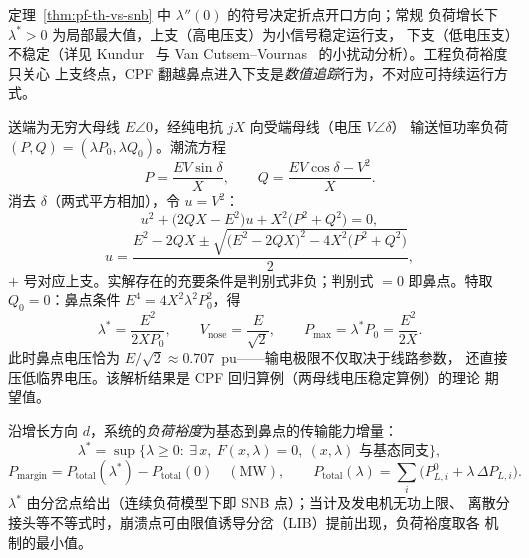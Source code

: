 \begin{remark}[鼻曲线上下支的稳定性解读]
定理~\ref{thm:pf-th-vs-snb} 中 $\lambda''(0)$ 的符号决定折点开口方向；常规
负荷增长下 $\lambda^*>0$ 为局部最大值，上支（高电压支）为小信号稳定运行支，
下支（低电压支）不稳定（详见 Kundur~\cite{pfvs:kundur} 与
Van Cutsem--Vournas~\cite{pfvs:vancutsem} 的小扰动分析）。工程负荷裕度只关心
上支终点，CPF 翻越鼻点进入下支是\emph{数值追踪}行为，不对应可持续运行方式。
\end{remark}

\begin{example}[两母线系统的解析鼻点]\label{ex:pf-th-vs-twobus}
送端为无穷大母线 $E\angle0$，经纯电抗 $jX$ 向受端母线（电压 $V\angle\delta$）
输送恒功率负荷 $(P,Q)=(\lambda P_0,\lambda Q_0)$。潮流方程
\begin{equation}
P=\frac{EV\sin\delta}{X},\qquad Q=\frac{EV\cos\delta-V^{2}}{X}.
\end{equation}
消去 $\delta$（两式平方相加），令 $u=V^{2}$：
\begin{equation}
u^{2}+\bigl(2QX-E^{2}\bigr)u+X^{2}\bigl(P^{2}+Q^{2}\bigr)=0,
\end{equation}
\begin{equation}
u=\frac{E^{2}-2QX\pm\sqrt{\bigl(E^{2}-2QX\bigr)^{2}-4X^{2}\bigl(P^{2}+Q^{2}\bigr)}}{2},
\end{equation}
$+$ 号对应上支。实解存在的充要条件是判别式非负；判别式 $=0$ 即鼻点。特取
$Q_0=0$：鼻点条件 $E^{4}=4X^{2}\lambda^{2}P_0^{2}$，得
\begin{equation}
\lambda^{*}=\frac{E^{2}}{2XP_0},\qquad
V_{\mathrm{nose}}=\frac{E}{\sqrt2},\qquad
P_{\max}=\lambda^{*}P_0=\frac{E^{2}}{2X}.
\end{equation}
此时鼻点电压恰为 $E/\sqrt2\approx0.707$~pu——输电极限不仅取决于线路参数，
还直接压低临界电压。该解析结果是 CPF 回归算例（两母线电压稳定算例）的理论
期望值。
\end{example}

\begin{definition}[负荷裕度]\label{def:pf-th-vs-margin}
沿增长方向 $d$，系统的\emph{负荷裕度}为基态到鼻点的传输能力增量：
\begin{equation}
\lambda^{*}=\sup\bigl\{\lambda\ge0:\ \exists\,x,\ F(x,\lambda)=0,\ (x,\lambda)
\text{ 与基态同支}\bigr\},
\end{equation}
\begin{equation}
P_{\mathrm{margin}}=P_{\mathrm{total}}(\lambda^{*})-P_{\mathrm{total}}(0)
\quad(\mathrm{MW}),\qquad
P_{\mathrm{total}}(\lambda)=\sum_i\bigl(P_{L,i}^{0}+\lambda\,\Delta P_{L,i}\bigr).
\end{equation}
$\lambda^{*}$ 由分岔点给出（连续负荷模型下即 SNB 点）；当计及发电机无功上限、
离散分接头等不等式时，崩溃点可由限值诱导分岔（LIB）提前出现，负荷裕度取各
机制的最小值。
\end{definition}

